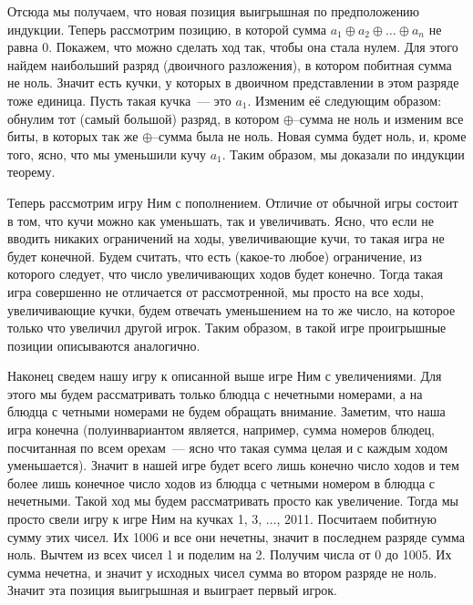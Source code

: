 Отсюда мы получаем, что новая позиция выигрышная по предположению индукции.
Теперь рассмотрим позицию, в которой сумма
$a_1 \oplus a_2 \oplus \ldots \oplus a_n$ не равна 0.
Покажем, что можно сделать ход так, чтобы она стала нулем.
Для этого найдем наибольший разряд (двоичного разложения), в котором побитная
сумма не ноль.
Значит есть кучки, у которых в двоичном представлении в этом разряде тоже
единица.
Пусть такая кучка~--- это $a_1$.
Изменим её следующим образом: обнулим тот (самый большой) разряд, в котором
$\oplus$--сумма не ноль и изменим все биты, в которых так же $\oplus$--сумма
была не ноль.
Новая сумма будет ноль, и, кроме того, ясно, что мы уменьшили кучу $a_1$.
Таким образом, мы доказали по индукции теорему.
\par
Теперь рассмотрим игру Ним с пополнением.
Отличие от обычной игры состоит в том, что кучи можно как уменьшать, так и
увеличивать.
Ясно, что если не вводить никаких ограничений на ходы, увеличивающие кучи, то
такая игра не будет конечной.
Будем считать, что есть (какое-то любое) ограничение, из которого следует, что
число увеличивающих ходов будет конечно.
Тогда такая игра совершенно не отличается от рассмотренной, мы просто на все
ходы, увеличивающие кучки, будем отвечать уменьшением на то же число, на
которое только что увеличил другой игрок.
Таким образом, в такой игре проигрышные позиции описываются аналогично.
\par
Наконец сведем нашу игру к описанной выше игре Ним с увеличениями.
Для этого мы будем рассматривать только блюдца с нечетными номерами, а на
блюдца с четными номерами не будем обращать внимание.
Заметим, что наша игра конечна
(полуинвариантом является, например, сумма номеров блюдец, посчитанная по всем
орехам~--- ясно что такая сумма целая и с каждым ходом уменьшается).
Значит в нашей игре будет всего лишь конечно число ходов и тем более лишь
конечное число ходов из блюдца с четными номером в блюдца с нечетными.
Такой ход мы будем рассматривать просто как увеличение.
Тогда мы просто свели игру к игре Ним на кучках 1, 3, $\ldots$, 2011.
Посчитаем побитную сумму этих чисел.
Их 1006 и все они нечетны, значит в последнем разряде сумма ноль.
Вычтем из всех чисел 1 и поделим на 2.
Получим числа от 0 до 1005.
Их сумма нечетна, и значит у исходных чисел сумма во втором разряде не ноль.
Значит эта позиция выигрышная и выиграет первый игрок.
\endproblem

